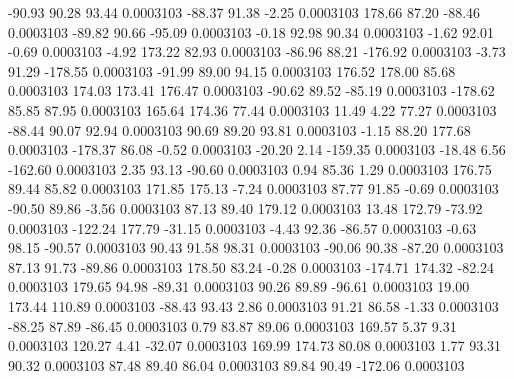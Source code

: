       -90.93       90.28       93.44     0.0003103
      -88.37       91.38       -2.25     0.0003103
      178.66       87.20      -88.46     0.0003103
      -89.82       90.66      -95.09     0.0003103
       -0.18       92.98       90.34     0.0003103
       -1.62       92.01       -0.69     0.0003103
       -4.92      173.22       82.93     0.0003103
      -86.96       88.21     -176.92     0.0003103
       -3.73       91.29     -178.55     0.0003103
      -91.99       89.00       94.15     0.0003103
      176.52      178.00       85.68     0.0003103
      174.03      173.41      176.47     0.0003103
      -90.62       89.52      -85.19     0.0003103
     -178.62       85.85       87.95     0.0003103
      165.64      174.36       77.44     0.0003103
       11.49        4.22       77.27     0.0003103
      -88.44       90.07       92.94     0.0003103
       90.69       89.20       93.81     0.0003103
       -1.15       88.20      177.68     0.0003103
     -178.37       86.08       -0.52     0.0003103
      -20.20        2.14     -159.35     0.0003103
      -18.48        6.56     -162.60     0.0003103
        2.35       93.13      -90.60     0.0003103
        0.94       85.36        1.29     0.0003103
      176.75       89.44       85.82     0.0003103
      171.85      175.13       -7.24     0.0003103
       87.77       91.85       -0.69     0.0003103
      -90.50       89.86       -3.56     0.0003103
       87.13       89.40      179.12     0.0003103
       13.48      172.79      -73.92     0.0003103
     -122.24      177.79      -31.15     0.0003103
       -4.43       92.36      -86.57     0.0003103
       -0.63       98.15      -90.57     0.0003103
       90.43       91.58       98.31     0.0003103
      -90.06       90.38      -87.20     0.0003103
       87.13       91.73      -89.86     0.0003103
      178.50       83.24       -0.28     0.0003103
     -174.71      174.32      -82.24     0.0003103
      179.65       94.98      -89.31     0.0003103
       90.26       89.89      -96.61     0.0003103
       19.00      173.44      110.89     0.0003103
      -88.43       93.43        2.86     0.0003103
       91.21       86.58       -1.33     0.0003103
      -88.25       87.89      -86.45     0.0003103
        0.79       83.87       89.06     0.0003103
      169.57        5.37        9.31     0.0003103
      120.27        4.41      -32.07     0.0003103
      169.99      174.73       80.08     0.0003103
        1.77       93.31       90.32     0.0003103
       87.48       89.40       86.04     0.0003103
       89.84       90.49     -172.06     0.0003103
